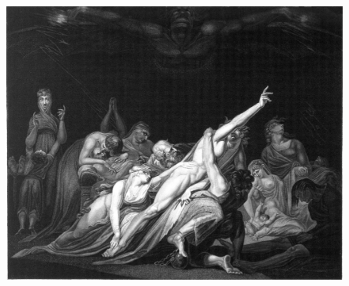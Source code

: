 \cleartoleftpage{}
\begin{figure}[p]
  \begingroup
  \centering
  \includegraphics[keepaspectratio,width=\textwidth]{figures/v7cfk63b-small.jpg}
  \label{fig:deathlooms}
\end{figure}
\clearpage{}
